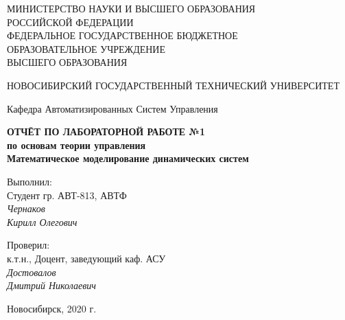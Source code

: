 \documentclass[12pt]{article}
\begin{document}
	
	\begin{titlepage}
		\begin{center}
			\large
			МИНИСТЕРСТВО НАУКИ И ВЫСШЕГО ОБРАЗОВАНИЯ\\ РОССИЙСКОЙ ФЕДЕРАЦИИ \\
			\vspace{0.05cm}
			ФЕДЕРАЛЬНОЕ ГОСУДАРСТВЕННОЕ БЮДЖЕТНОЕ\\ ОБРАЗОВАТЕЛЬНОЕ УЧРЕЖДЕНИЕ \\ ВЫСШЕГО ОБРАЗОВАНИЯ 
			
			\vspace{0.25cm}
			
			НОВОСИБИРСКИЙ ГОСУДАРСТВЕННЫЙ ТЕХНИЧЕСКИЙ УНИВЕРСИТЕТ
			\vspace{0.5cm}
			
			
			Кафедра Автоматизированных Систем Управления
			\vfill
			
			
			\textbf{ОТЧЁТ ПО ЛАБОРАТОРНОЙ РАБОТЕ №1}\\[2mm]
			\textbf{по основам теории управления}\\[2mm]
			\textbf{Математическое моделирование динамических систем}\\[3mm]
			\vspace{0.1cm}
		\end{center}
		\vfill
		\newlength{\ML}
		\hfill\begin{minipage}{0.3\textwidth}
			Выполнил:\\
			Студент гр. АВТ-813, АВТФ \\
			
			{\it Чернаков} \\
			{\it Кирилл Олегович}\\
			
		\end{minipage}%
		\bigskip
		
		\hfill\begin{minipage}{0.3\textwidth}
			Проверил:\\
			к.т.н., Доцент, заведующий каф. АСУ \\
			{\it Достовалов} \\
			{\it Дмитрий Николаевич}
		\end{minipage}%
		\vfill
		
		\begin{center}
			Новосибирск, 2020 г.
		\end{center}
	\end{titlepage}  
	\tableofcontents
	\newpage
	
\end{document}
